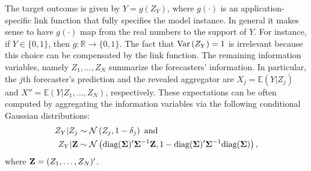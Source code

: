 \documentclass[11pt]{article}
\newcommand{\R}{\mathbb{R}}
\newcommand{\E}{\mathbb{E}}
\theoremstyle{definition}
\theoremstyle{definition}
\def\bSigma{{\bf \Sigma}}
\def\Z{{\bf Z}}
\def\E{{\mathbb E}}
\def\Var{{\rm Var}\,}
\def\diag{\text{diag}}
\def\diag{\text{diag}}
\begin{document}
The target outcome is given by $Y = g(Z_Y)$, where $g(\cdot)$ is an application-specific link function that fully specifies the model instance. In general it makes sense to have $g(\cdot)$ map from the real numbers to the support of $Y$. For instance, if $Y \in \{0,1\}$, then $g : \R \to \{0,1\}$. The fact that $\Var(Z_Y) = 1$ is irrelevant because this choice can be compensated by the link function.
The remaining information variables, namely $Z_1, \dots, Z_N$ summarize the forecasters' information. 
In particular, the $j$th forecaster's prediction and the revealed aggregator are $X_j = \E(Y | Z_j)$ and $X'' = \E(Y | Z_1, \dots, Z_N)$, respectively.  These expectations can be often computed by aggregating the information variables via the following conditional Gaussian distributions:
\begin{align*}
 Z_Y | Z_j &\sim \mathcal{N}\left(Z_j, 1-\delta_j\right) \text{ and }\\
Z_Y | \Z &\sim \mathcal{N}\left(\diag(\bSigma)' \bSigma^{-1} \Z, 1-\diag(\bSigma)' \bSigma^{-1}\diag(\bSigma)\right),
\end{align*}
where $\Z = (Z_1, \dots, Z_N)'$. 
\end{document}
